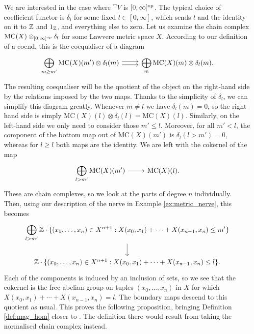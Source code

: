 We are interested in the case where $\cat{V}$ is $[0,\infty]^{\mathrm{op}}$. The typical choice of coefficient functor is $\delta_l$ for some fixed $l \in [0,\infty]$, which sends $l$ and the identity on it to $\mathbb{Z}$ and $1_{\mathbb{Z}}$, and everything else to zero. Let us examine the chain complex $\mathrm{MC}(X) \otimes_{[0,\infty]^{\mathrm{op}}} \delta_l$ for some Lawvere metric space $X$. According to our definition of a coend, this is the coequaliser of a diagram
\[\begin{tikzcd}
    \displaystyle \bigoplus_{m \geq m'} \mathrm{MC}(X)(m') \otimes \delta_l(m) \ar[r, shift left] \ar[r, shift right] &
    \displaystyle \bigoplus_{m} \mathrm{MC}(X)(m) \otimes \delta_l(m).
\end{tikzcd}\]
The resulting coequaliser will be the quotient of the object on the right-hand side by the relations imposed by the two maps. Thanks to the simplicity of $\delta_l$, we can simplify this diagram greatly. Whenever $m \neq l$ we have $\delta_l(m) = 0$, so the right-hand side is simply $\mathrm{MC}(X)(l) \otimes \delta_l(l) = \mathrm{MC}(X)(l)$. Similarly, on the left-hand side we only need to consider those $m' \leq l$. Moreover, for all $m' < l$, the component of the bottom map out of $\mathrm{MC}(X)(m')$ is $\delta_l(l > m') = 0$, whereas for $l \geq l$ both maps are the identity. We are left with the cokernel of the map
\[\begin{tikzcd}
    \displaystyle \bigoplus_{l > m'} \mathrm{MC}(X)(m') \ar[r] &
    \mathrm{MC}(X)(l).
\end{tikzcd}\]
These are chain complexes, so we look at the parts of degree $n$ individually. Then, using our description of the nerve in Example \ref{ex:metric_nerve}, this becomes
\[\begin{tikzcd}
    \displaystyle \bigoplus_{l>m'} \Z \cdot \{(x_0,\dots,x_n) \in X^{n+1} : X(x_0,x_1) + \cdots + X(x_{n-1},x_n) \leq m'\} \ar[d] \\
    \Z \cdot \{(x_0,\dots,x_n) \in X^{n+1} : X(x_0,x_1) + \cdots + X(x_{n-1},x_n) \leq l\}.
\end{tikzcd}\]
Each of the components is induced by an inclusion of sets, so we see that the cokernel is the free abelian group on tuples $(x_0,\dots,x_n)$ in $X$ for which $X(x_0,x_1) + \cdots + X(x_{n-1},x_n) = l$. The boundary maps descend to this quotient as usual. This proves the following proposition, bringing Definition \ref{def:mag_hom} closer to \cite[Definition 3.3]{Leinster2021}. The definition there would result from taking the normalised chain complex instead.

